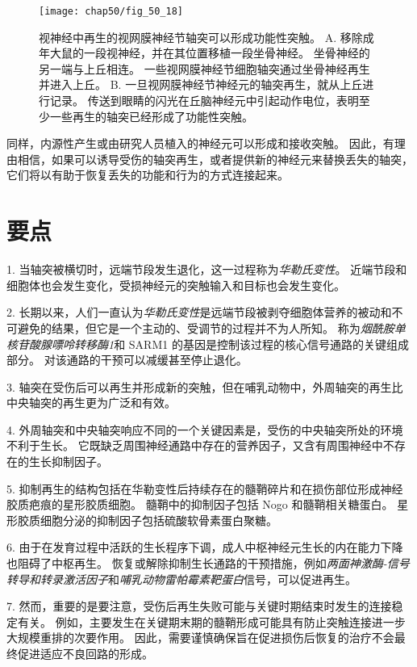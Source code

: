\begin{figure}[htbp]
	\centering
	\texttt{[image: chap50/fig\_50\_18]}
	\caption{视神经中再生的视网膜神经节轴突可以形成功能性突触\cite{keirstead1989electrophysiologic}。
		A. 移除成年大鼠的一段视神经，并在其位置移植一段坐骨神经。
		坐骨神经的另一端与上丘相连。
		一些视网膜神经节细胞轴突通过坐骨神经再生并进入上丘。
		B. 一旦视网膜神经节神经元的轴突再生，就从上丘进行记录。
		传送到眼睛的闪光在丘脑神经元中引起动作电位，表明至少一些再生的轴突已经形成了功能性突触。}
	\label{fig:50_18}
\end{figure}


同样，内源性产生或由研究人员植入的神经元可以形成和接收突触。
因此，有理由相信，如果可以诱导受伤的轴突再生，或者提供新的神经元来替换丢失的轴突，它们将以有助于恢复丢失的功能和行为的方式连接起来。



\section{要点}

1. 当轴突被横切时，远端节段发生退化，这一过程称为\textit{华勒氏变性}。
近端节段和细胞体也会发生变化，受损神经元的突触输入和目标也会发生变化。


2. 长期以来，人们一直认为\textit{华勒氏变性}是远端节段被剥夺细胞体营养的被动和不可避免的结果，但它是一个主动的、受调节的过程并不为人所知。
称为\textit{烟酰胺单核苷酸腺嘌呤转移酶1}和 SARM1 的基因是控制该过程的核心信号通路的关键组成部分。
对该通路的干预可以减缓甚至停止退化。 


3. 轴突在受伤后可以再生并形成新的突触，但在哺乳动物中，外周轴突的再生比中央轴突的再生更为广泛和有效。


4. 外周轴突和中央轴突响应不同的一个关键因素是，受伤的中央轴突所处的环境不利于生长。
它既缺乏周围神经通路中存在的营养因子，又含有周围神经中不存在的生长抑制因子。


5. 抑制再生的结构包括在华勒变性后持续存在的髓鞘碎片和在损伤部位形成神经胶质疤痕的星形胶质细胞。
髓鞘中的抑制因子包括 Nogo 和髓鞘相关糖蛋白。
星形胶质细胞分泌的抑制因子包括硫酸软骨素蛋白聚糖。
 

6. 由于在发育过程中活跃的生长程序下调，成人中枢神经元生长的内在能力下降也阻碍了中枢再生。
恢复或解除抑制生长通路的干预措施，例如\textit{两面神激酶-信号转导和转录激活因子}和\textit{哺乳动物雷帕霉素靶蛋白}信号，可以促进再生。


7. 然而，重要的是要注意，受伤后再生失败可能与关键时期结束时发生的连接稳定有关。
例如，主要发生在关键期末期的髓鞘形成可能具有防止突触连接进一步大规模重排的次要作用。
因此，需要谨慎确保旨在促进损伤后恢复的治疗不会最终促进适应不良回路的形成。 


